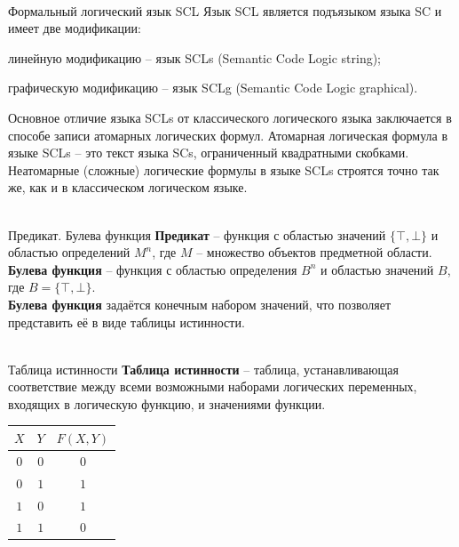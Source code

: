 \begin{frame}{\\Формальный логический язык SCL}
	\topline
	\justifying
	Язык SCL является подъязыком языка SC и имеет две модификации:
	\begin{textitemize}
		\item{линейную модификацию – язык SCLs (Semantic Code Logic string);}
		\item{графическую модификацию – язык SCLg (Semantic Code Logic graphical). }
	\end{textitemize}
	Основное отличие языка SCLs от классического логического языка заключается в способе записи атомарных логических формул. Атомарная логическая формула в языке SCLs – это текст языка SCs, ограниченный квадратными скобками. Неатомарные (сложные) логические формулы в языке SCLs строятся точно так же, как и в классическом логическом языке.
\end{frame}

\begin{frame}{\\Предикат. Булева функция}
	\topline
	\textbf{Предикат} -- функция с областью значений $\{\top, \bot\}$ и областью определений $M^n$, где $M$ -- множество объектов предметной области.\\
	\textbf{Булева функция} -- функция с областью определения $B^n$ и областью значений $B$, где $B = \{\top, \bot\}$.\\
	\textbf{Булева функция} задаётся конечным набором значений, что позволяет представить её в виде таблицы истинности.
\end{frame}

\begin{frame}{\\Таблица истинности}
	\topline
	\justifying
	\textbf{Таблица истинности} -- таблица, устанавливающая соответствие между всеми возможными наборами логических переменных, входящих в логическую функцию, и значениями функции.\\
	\vspace{5mm}
	\begin{center}
		\begin{tabular}{|c|c|c|}
			\hline
			$X$ & $Y$ & $F(X,Y)$\\
			\hline
			$0$ & $0$ & $0$\\
			\hline
			$0$ & $1$ & $1$\\
			\hline
			$1$ & $0$ & $1$\\
			\hline
			$1$ & $1$ & $0$\\
			\hline
		\end{tabular}
	\end{center}
\end{frame}

